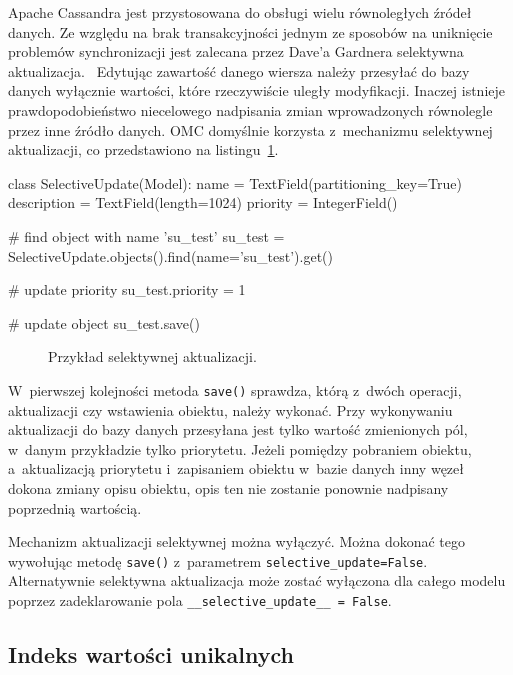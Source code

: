 Apache Cassandra jest przystosowana do obsługi wielu równoległych źródeł danych. Ze względu na brak transakcyjności jednym ze sposobów na uniknięcie problemów synchronizacji jest zalecana przez Dave'a Gardnera selektywna aktualizacja.~\cite{cassandra_concepts_patterns_antipatterns} Edytując zawartość danego wiersza należy przesyłać do bazy danych wyłącznie wartości, które rzeczywiście uległy modyfikacji. Inaczej istnieje prawdopodobieństwo niecelowego nadpisania zmian wprowadzonych równolegle przez inne źródło danych. OMC domyślnie korzysta z~mechanizmu selektywnej aktualizacji, co przedstawiono na listingu~\ref{lst:selective_update_modeling}.

\begin{verbbox}
class SelectiveUpdate(Model):
    name = TextField(partitioning_key=True)
    description = TextField(length=1024)
    priority = IntegerField()

# find object with name 'su_test'
su_test = SelectiveUpdate.objects().find(name='su_test').get()

# update priority
su_test.priority = 1

# update object
su_test.save()
\end{verbbox}

\begin{figure}[ht!]
	\centering
	\theverbbox
	\caption{Przykład selektywnej aktualizacji.}
	\label{lst:selective_update_modeling}
\end{figure}

W~pierwszej kolejności metoda \verb+save()+ sprawdza, którą z~dwóch operacji, aktualizacji czy wstawienia obiektu, należy wykonać. Przy wykonywaniu aktualizacji do bazy danych przesyłana jest tylko wartość zmienionych pól, w~danym przykładzie tylko priorytetu. Jeżeli pomiędzy pobraniem obiektu, a~aktualizacją priorytetu i~zapisaniem obiektu w~bazie danych inny węzeł dokona zmiany opisu obiektu, opis ten nie zostanie ponownie nadpisany poprzednią wartością.

Mechanizm aktualizacji selektywnej można wyłączyć. Można dokonać tego wywołując metodę \verb+save()+ z~parametrem \verb+selective_update=False+. Alternatywnie selektywna aktualizacja może zostać wyłączona dla całego modelu poprzez zadeklarowanie pola \verb+__selective_update__ = False+.

\subsection{Indeks wartości unikalnych}

